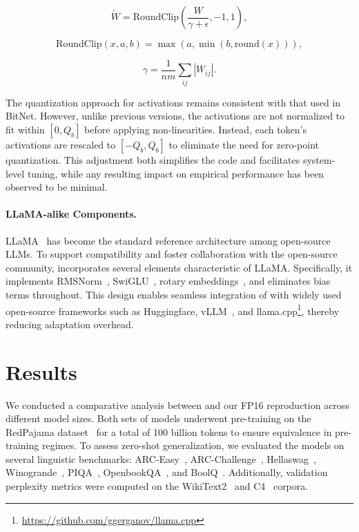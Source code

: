 \begin{equation}
    \widetilde{W} = \mathrm{RoundClip}(\frac{W}{\gamma + \epsilon}, -1, 1),
\end{equation}

\begin{equation}
    \mathrm{RoundClip}(x, a, b) = \max(a, \min(b, \mathrm{round}(x))),
\end{equation}

\begin{equation}
    \gamma = \frac{1}{nm}\sum_{ij} |W_{ij}|.
\end{equation}

The quantization approach for activations remains consistent with that used in BitNet. However, unlike previous versions, the activations are not normalized to fit within $[0, Q_b]$ before applying non-linearities. Instead, each token’s activations are rescaled to $[-Q_b, Q_b]$ to eliminate the need for zero-point quantization. This adjustment both simplifies the code and facilitates system-level tuning, while any resulting impact on empirical performance has been observed to be minimal.

\paragraph{LLaMA-alike Components.}

LLaMA~\cite{llama, llama2} has become the standard reference architecture among open-source LLMs. To support compatibility and foster collaboration with the open-source community,  incorporates several elements characteristic of LLaMA. Specifically, it implements RMSNorm~\cite{rmsnorm}, SwiGLU~\cite{swiglu}, rotary embeddings~\cite{rope}, and eliminates bias terms throughout. This design enables seamless integration of  with widely used open-source frameworks such as Huggingface, vLLM~\cite{vllm}, and llama.cpp\footnote{\url{https://github.com/ggerganov/llama.cpp}}, thereby reducing adaptation overhead.

\section{Results}

We conducted a comparative analysis between  and our FP16  reproduction across different model sizes. Both sets of models underwent pre-training on the RedPajama dataset~\cite{redpajama} for a total of 100 billion tokens to ensure equivalence in pre-training regimes. To assess zero-shot generalization, we evaluated the models on several linguistic benchmarks: ARC-Easy~\cite{arc}, ARC-Challenge~\cite{arc}, Hellaswag~\cite{hellaswag}, Winogrande~\cite{winoGrande}, PIQA~\cite{piqa}, OpenbookQA~\cite{openbookqa}, and BoolQ~\cite{boolq}. Additionally, validation perplexity metrics were computed on the WikiText2~\cite{wikitext2} and C4~\cite{c4} corpora.

